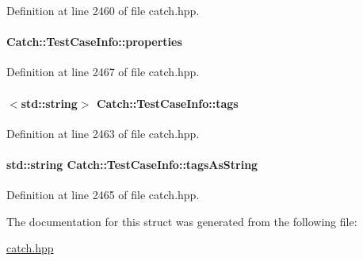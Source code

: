 Definition at line 2460 of file catch.\+hpp.

\hypertarget{a00086_afc1e84bd7a2e180895a06d9131302af0}{}
\paragraph[{properties}]{ Catch\+::\+Test\+Case\+Info\+::properties}\label{a00086_afc1e84bd7a2e180895a06d9131302af0}


Definition at line 2467 of file catch.\+hpp.

\hypertarget{a00086_a045f62e7719a8760a5b456f7fd2dc97c}{}
\paragraph[{tags}]{$<$std\+::string$>$ Catch\+::\+Test\+Case\+Info\+::tags}\label{a00086_a045f62e7719a8760a5b456f7fd2dc97c}


Definition at line 2463 of file catch.\+hpp.

\hypertarget{a00086_ac65c2d36fd36f71e9bf782b2ea245c64}{}
\paragraph[{tags\+As\+String}]{\setlength{\rightskip}{0pt plus 5cm}std\+::string Catch\+::\+Test\+Case\+Info\+::tags\+As\+String}\label{a00086_ac65c2d36fd36f71e9bf782b2ea245c64}


Definition at line 2465 of file catch.\+hpp.



The documentation for this struct was generated from the following file\+:\begin{DoxyCompactItemize}
\item 
\hyperlink{a00094}{catch.\+hpp}\end{DoxyCompactItemize}
